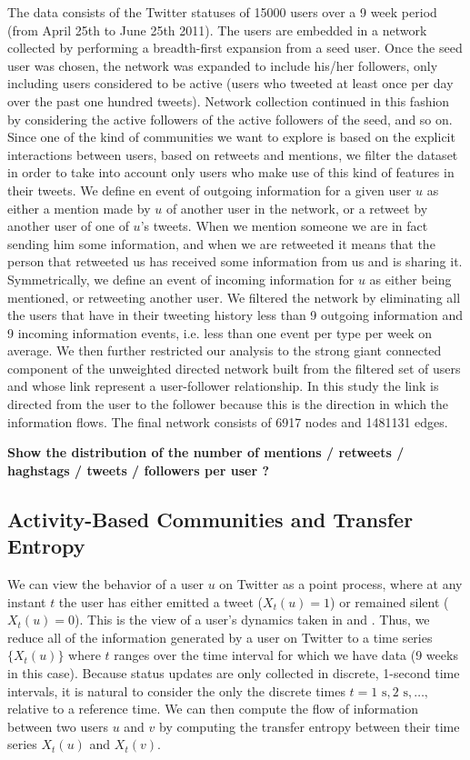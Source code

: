 The data consists of the Twitter statuses of 15000 users over a 9 week period (from April 25th to June 25th 2011). The users are embedded in a network collected by performing a breadth-first expansion from a seed user. Once the seed user was chosen, the network was expanded to include his/her followers, only including users considered to be active (users who tweeted at least once per day over the past one hundred tweets). Network collection continued in this fashion by considering the active followers of the active followers of the seed, and so on.
Since one of the kind of communities we want to explore is based on the explicit interactions between users, based on retweets and mentions, we filter the dataset in order to take into account only users who make use of this kind of features in their tweets. We define en event of outgoing information for a given user $u$ as either a mention made by $u$ of another user in the network, or a retweet by another user of one of $u$'s tweets. When we mention someone we are in fact sending him some information, and when we are retweeted it means that the person that retweeted us has received some information from us and is sharing it. Symmetrically, we define an event of incoming information for $u$ as either being mentioned, or retweeting another user. We filtered the network by eliminating all the users that have in their tweeting history less than 9 outgoing information and 9 incoming information events, i.e. less than one event per type per week on average. We then further restricted our analysis to the strong giant connected component of the unweighted directed network built from the filtered set of users and whose link represent a user-follower relationship. In this study the link is directed from the user to the follower because this is the direction in which the information flows. The final network consists of 6917 nodes and 1481131 edges.

\textbf{Show the distribution of the number of mentions / retweets / haghstags / tweets / followers per user ?}

\subsection{Activity-Based Communities and Transfer Entropy}
\label{sec:method-activity}

We can view the behavior of a user $u$ on Twitter as a point process, where at any instant $t$ the user has either emitted a tweet ($X_{t}(u) = 1$) or remained silent ($X_{t}(u) = 0$). This is the view of a user's dynamics taken in \cite{ver2012information} and \cite{darmon2013understanding}. Thus, we reduce all of the information generated by a user on Twitter to a time series $\{ X_{t}(u)\}$ where $t$ ranges over the time interval for which we have data (9 weeks in this case). Because status updates are only collected in discrete, 1-second time intervals, it is natural to consider the only the discrete times $t = 1 \text{ s}, 2 \text{ s}, \ldots, $ relative to a reference time. We can then compute the flow of information between two users $u$ and $v$ by computing the transfer entropy between their time series $X_{t}(u)$ and $X_{t}(v).$


